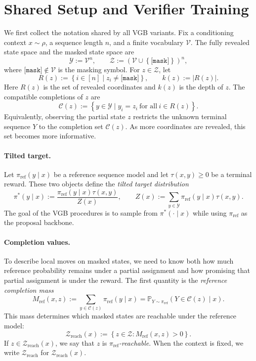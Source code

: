 \documentclass{article}
\numberwithin{theorem}{section}
\numberwithin{proposition}{section}
\numberwithin{corollary}{section}
\numberwithin{lemma}{section}
\numberwithin{conjecture}{section}
\numberwithin{remark}{section}
\numberwithin{definition}{section}
\numberwithin{assumption}{section}
\numberwithin{example}{section}
\newcommand{\calC}{{\mathcal{C}}}
\newcommand{\calV}{{\mathcal{V}}}
\newcommand{\calY}{{\mathcal{Y}}}
\newcommand{\calZ}{{\mathcal{Z}}}
\newcommand{\bbP}{\mathbb{P}}
\newcommand{\lbra}[1]{\left[#1\right]}
\newcommand{\mbra}[1]{\left\{#1\right\}}
\newcommand{\sbra}[1]{\left(#1\right)}
\newcommand{\abs}[1]{\left| #1\right|}
\providecommand{\mask}{\texttt{[mask]}}
\providecommand{\base}{\pi_{\mathrm{ref}}}
\begin{document}
\section{Shared Setup and Verifier Training}
\label{app:sec:shared_setup_verifier_training}
We first collect the notation shared by all VGB variants. Fix a conditioning context $x\sim\rho$, a sequence length $n$, and a finite vocabulary $\calV$. The fully revealed state space and the masked state space are
\begin{equation*}
    \calY := \calV^n, \qquad \calZ := \sbra{\calV\cup\mbra{\mask}}^n,
\end{equation*}
where $\mask\notin\calV$ is the masking symbol. For $z\in\calZ$, let
\begin{equation*}
    R(z) := \mbra{i\in\lbra{n}\mid z_i\neq\mask}, \qquad k(z):=\abs{R(z)}.
\end{equation*}
Here $R(z)$ is the set of revealed coordinates and $k(z)$ is the depth of $z$. The compatible completions of $z$ are
\begin{equation*}
    \calC(z) := \mbra{y\in\calY \mid y_i=z_i\ \text{for all}\ i\in R(z)}.
\end{equation*}
Equivalently, observing the partial state $z$ restricts the unknown terminal sequence $Y$ to the completion set $\calC(z)$. As more coordinates are revealed, this set becomes more informative.

\paragraph{Tilted target.}
Let $\base(y\mid x)$ be a reference sequence model and let $\tau(x,y)\ge 0$ be a terminal reward. These two objects define the \emph{tilted target distribution}
\begin{equation*}
    \pi^*(y\mid x) := \frac{\base(y\mid x)\tau(x,y)}{Z(x)}, \qquad Z(x):=\sum_{y\in\calY}\base(y\mid x)\tau(x,y).
\end{equation*}
The goal of the VGB procedures is to sample from $\pi^*(\cdot\mid x)$ while using $\base$ as the proposal backbone.

\paragraph{Completion values.}
To describe local moves on masked states, we need to know both how much reference probability remains under a partial assignment and how promising that partial assignment is under the reward. The first quantity is the \emph{reference completion mass}
\begin{equation*}
    M_{\mathrm{ref}}(x,z) := \sum_{y\in\calC(z)} \base(y\mid x) = \bbP_{Y\sim\base}(Y\in\calC(z)\mid x).
\end{equation*}
This mass determines which masked states are reachable under the reference model:
\begin{equation*}
    \calZ_{\mathrm{reach}}(x) := \mbra{z\in\calZ: M_{\mathrm{ref}}(x,z)>0}.
\end{equation*}
If $z\in\calZ_{\mathrm{reach}}(x)$, we say that $z$ is \emph{$\base$-reachable}. When the context is fixed, we write \(\calZ_{\mathrm{reach}}\) for \(\calZ_{\mathrm{reach}}(x)\).
\end{document}
